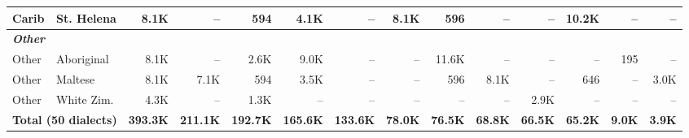 \begin{table}[t]
{\begin{tabular}{llrrrrrrrrrrrr}
Carib & St. Helena & 8.1K & -- & 594 & 4.1K & -- & 8.1K & 596 & -- & -- & 10.2K & -- & -- \\
\midrule
\multicolumn{14}{l}{\textit{\textbf{Other}}} \\
Other & Aboriginal & 8.1K & -- & 2.6K & 9.0K & -- & -- & 11.6K & -- & -- & -- & 195 & -- \\
Other & Maltese & 8.1K & 7.1K & 594 & 3.5K & -- & -- & 596 & 8.1K & -- & 646 & -- & 3.0K \\
Other & White Zim. & 4.3K & -- & 1.3K & -- & -- & -- & -- & -- & 2.9K & -- & -- & -- \\
\midrule
\multicolumn{2}{l}{\textbf{Total (50 dialects)}} & \textbf{393.3K} & \textbf{211.1K} & \textbf{192.7K} & \textbf{165.6K} & \textbf{133.6K} & \textbf{78.0K} & \textbf{76.5K} & \textbf{68.8K} & \textbf{66.5K} & \textbf{65.2K} & \textbf{9.0K} & \textbf{3.9K} \\
\bottomrule
\end{tabular}
}
\end{table}